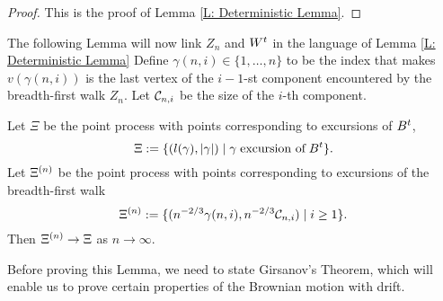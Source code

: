 \begin{proof}
	This is the proof of Lemma \ref{L: Deterministic Lemma}. 
\end{proof}


The following Lemma will now link $Z_n$ and $W^t$ in the language of Lemma \ref{L: Deterministic Lemma}
Define $\gamma (n, i) \in \{1, \dots, n\}$ to be the index that makes
$v(\gamma(n,i))$ is the last vertex of the $i-1$-st component encountered by the breadth-first walk $Z_n$.
Let $\mathcal{C}_{n,i}$ be the size of the $i$-th component.

\begin{lemma} \label{L: Lemma 8}
	Let $\Xi$ be the point process with points corresponding to excursions of $B^t$,
	\begin{equation} \label{E: Lemma 8 def Xi}
	\Xi := \{ (l(\gamma), |\gamma|) \; | \; \gamma \; \text{excursion of} \; B^t \}.
	\end{equation}
	Let $\Xi^{(n)}$ be the point process with points corresponding to excursions of the breadth-first walk
	\begin{equation} \label{E: Lemma 8 def Xin}
	\Xi^{(n)} := \{ ( n^{-2 / 3} \gamma(n,i), n^{-2 / 3} \mathcal{C}_{n,i} ) \; | \; i \geq 1 \}.
	\end{equation}
	Then $\Xi^{(n)} \rightarrow \Xi$ as $n \rightarrow \infty$.
\end{lemma}

Before proving this Lemma, we need to state Girsanov's Theorem, 
which will enable us to prove certain properties of the Brownian motion with drift.


